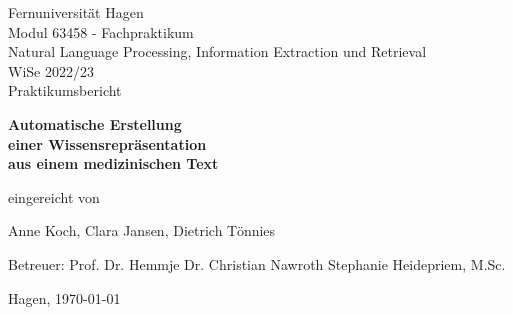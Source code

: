 \thispagestyle{empty}

\begin{titlepage}


\begin{center}

{\huge Fernuniversität Hagen} \\ [1,0cm]

{\Large Modul 63458 - Fachpraktikum \\ [0,3 cm]
Natural Language Processing, Information Extraction und Retrieval \\ [0,3 cm]
WiSe 2022/23} \\ [3cm]

{\huge Praktikumsbericht}

\vspace{8ex}

{\huge\bfseries
Automatische Erstellung \\[0,5cm]
einer Wissensrepräsentation \\[0,5cm]
aus einem medizinischen Text \\[0,5cm]
}

\vspace{8ex}

{\large eingereicht von}

\vspace{4ex}

{\Large Anne Koch, Clara Jansen, Dietrich Tönnies}
 
\end{center}

\vspace{6ex}

{\Large \hspace{2,4cm} Betreuer:  Prof. Dr. Hemmje
\vspace{0,2cm}
  Dr. Christian Nawroth
\vspace{0,5cm}
 Stephanie Heidepriem, M.Sc.}

\vfill

\begin{center}
{\large Hagen, \today}
\end{center}

\end{titlepage}

